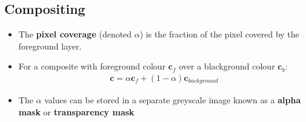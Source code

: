 \subsection{Compositing}

\begin{itemize}
  \item The \textbf{pixel coverage} (denoted $\alpha$) is the fraction of the pixel covered by the foreground layer.
  \item For a composite with foreground colour $\textbf{c}_{f}$ over a blackground colour $\textbf{c}_{b}$:
  \begin{align*}
    \textbf{c} = \alpha \textbf{c}_{f} + (1 - \alpha)\textbf{c}_{background}
  \end{align*}
  \item The $\alpha$ values can be stored in a separate greyscale image known as a \textbf{alpha mask} or \textbf{transparency mask}
\end{itemize}
